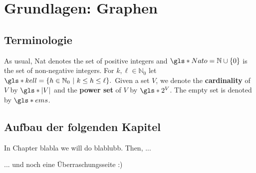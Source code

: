 \chapter{Grundlagen: Graphen}



\section{Terminologie} %
As usual, \gls*{Nat} denotes the set of positive integers and $\gls*{Nato} = \mathbb{N}\cup \{0\}$ is the set of non-negative integers. For $k,\ell \in \mathbb{N}_0$ let 
$\gls*{kell}=\{h \in \mathbb{N}_0 ~|~ k \leq h \leq \ell\}.$ Given a set $V$, we denote the \textbf{cardinality} of $V$ by $\gls*{|V|}$ and the \textbf{power set} of $V$ by $\gls*{2^V}$. The empty set is denoted by $\gls*{ems}$.



\section{Aufbau der folgenden Kapitel}

In Chapter blabla we will do blablubb. Then, ...

\newpage

... und noch eine Überraschungsseite :)